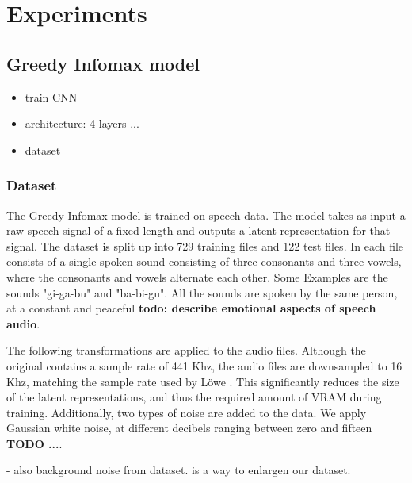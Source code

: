 \chapter{Experiments}

\section{Greedy Infomax model}
\begin{itemize}
	\item train CNN
	\item architecture: 4 layers ...
	\item dataset
\end{itemize}


\subsection{Dataset}
The Greedy Infomax model is trained on speech data. The model takes as input a raw speech signal of a fixed length and outputs a latent representation for that signal. The dataset is split up into 729 training files and 122 test files. In each file consists of a single spoken sound consisting of three consonants and three vowels, where the consonants and vowels alternate each other. Some Examples are the sounds "gi-ga-bu" and "ba-bi-gu". All the sounds are spoken by the same person, at a constant and peaceful \textbf{todo: describe emotional aspects of speech audio}. 

The following transformations are applied to the audio files. Although the original contains a sample rate of 441 Khz, the audio files are downsampled to 16 Khz, matching the sample rate used by Löwe \cite{lowePuttingEndEndtoEnd2020}. This significantly reduces the size of the latent representations, and thus the required amount of VRAM during training. Additionally, two types of noise are added to the data. We apply Gaussian white noise, at different decibels ranging between zero and fifteen \textbf{TODO ...}.

- also background noise from dataset. is a way to enlargen our dataset. 

%

